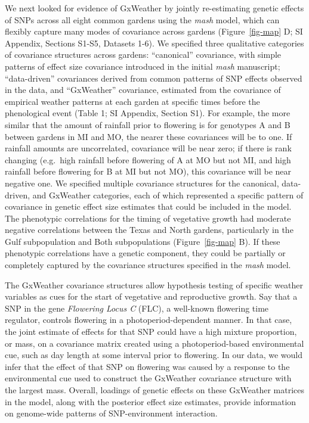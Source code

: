 \documentclass[
  9pt,
  twocolumn,
  twoside]{pnas-new}
\begin{document}
We next looked for evidence of GxWeather by jointly re-estimating
genetic effects of SNPs across all eight common gardens using the
\emph{mash} model, which can flexibly capture many modes of covariance
across gardens (Figure~\ref{fig-map} D; SI Appendix, Sections S1-S5,
Datasets 1-6). We specified three qualitative categories of covariance
structures across gardens: ``canonical'' covariance, with simple
patterns of effect size covariance introduced in the initial \emph{mash}
manuscript; ``data-driven'' covariances derived from common patterns of
SNP effects observed in the data, and ``GxWeather'' covariance,
estimated from the covariance of empirical weather patterns at each
garden at specific times before the phenological event (Table 1; SI
Appendix, Section S1). For example, the more similar that the amount of
rainfall prior to flowering is for genotypes A and B between gardens in
MI and MO, the nearer these covariances will be to one. If rainfall
amounts are uncorrelated, covariance will be near zero; if there is rank
changing (e.g.~high rainfall before flowering of A at MO but not MI, and
high rainfall before flowering for B at MI but not MO), this covariance
will be near negative one. We specified multiple covariance structures
for the canonical, data-driven, and GxWeather categories, each of which
represented a specific pattern of covariance in genetic effect size
estimates that could be included in the model. The phenotypic
correlations for the timing of vegetative growth had moderate negative
correlations between the Texas and North gardens, particularly in the
Gulf subpopulation and Both subpopulations (Figure~\ref{fig-map} B). If
these phenotypic correlations have a genetic component, they could be
partially or completely captured by the covariance structures specified
in the \emph{mash} model.

The GxWeather covariance structures allow hypothesis testing of specific
weather variables as cues for the start of vegetative and reproductive
growth. Say that a SNP in the gene \emph{Flowering Locus C} (FLC), a
well-known flowering time regulator, controls flowering in a
photoperiod-dependent manner. In that case, the joint estimate of
effects for that SNP could have a high mixture proportion, or mass, on a
covariance matrix created using a photoperiod-based environmental cue,
such as day length at some interval prior to flowering. In our data, we
would infer that the effect of that SNP on flowering was caused by a
response to the environmental cue used to construct the GxWeather
covariance structure with the largest mass. Overall, loadings of genetic
effects on these GxWeather matrices in the model, along with the
posterior effect size estimates, provide information on genome-wide
patterns of SNP-environment interaction.
\end{document}
